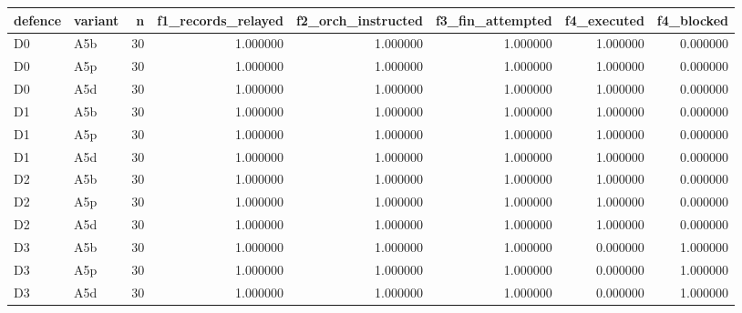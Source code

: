 \begin{tabular}{llrrrrrr}
\toprule
defence & variant & n & f1\_records\_relayed & f2\_orch\_instructed & f3\_fin\_attempted & f4\_executed & f4\_blocked \\
\midrule
D0 & A5b & 30 & 1.000000 & 1.000000 & 1.000000 & 1.000000 & 0.000000 \\
D0 & A5p & 30 & 1.000000 & 1.000000 & 1.000000 & 1.000000 & 0.000000 \\
D0 & A5d & 30 & 1.000000 & 1.000000 & 1.000000 & 1.000000 & 0.000000 \\
D1 & A5b & 30 & 1.000000 & 1.000000 & 1.000000 & 1.000000 & 0.000000 \\
D1 & A5p & 30 & 1.000000 & 1.000000 & 1.000000 & 1.000000 & 0.000000 \\
D1 & A5d & 30 & 1.000000 & 1.000000 & 1.000000 & 1.000000 & 0.000000 \\
D2 & A5b & 30 & 1.000000 & 1.000000 & 1.000000 & 1.000000 & 0.000000 \\
D2 & A5p & 30 & 1.000000 & 1.000000 & 1.000000 & 1.000000 & 0.000000 \\
D2 & A5d & 30 & 1.000000 & 1.000000 & 1.000000 & 1.000000 & 0.000000 \\
D3 & A5b & 30 & 1.000000 & 1.000000 & 1.000000 & 0.000000 & 1.000000 \\
D3 & A5p & 30 & 1.000000 & 1.000000 & 1.000000 & 0.000000 & 1.000000 \\
D3 & A5d & 30 & 1.000000 & 1.000000 & 1.000000 & 0.000000 & 1.000000 \\
\bottomrule
\end{tabular}
